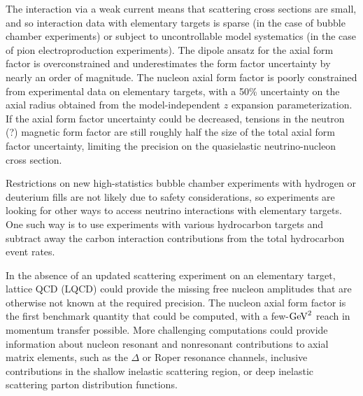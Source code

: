 The interaction via a weak current means that scattering cross sections are small,
 and so interaction data with elementary targets is sparse
 (in the case of bubble chamber experiments)
 or subject to uncontrollable model systematics
 (in the case of pion electroproduction experiments).
The dipole ansatz for the axial form factor is overconstrained
 and underestimates the form factor uncertainty by nearly an order of magnitude.
The nucleon axial form factor is poorly constrained from experimental data
 on elementary targets, with a 50\% uncertainty on the axial radius
 obtained from the model-independent $z$ expansion parameterization.
If the axial form factor uncertainty could be decreased,
 tensions in the neutron (?) magnetic form factor are still
 roughly half the size of the total axial form factor uncertainty,
 limiting the precision on the quasielastic neutrino-nucleon cross section.

Restrictions on new high-statistics bubble chamber experiments with
 hydrogen or deuterium fills are not likely due to safety considerations,
 so experiments are looking for other ways to access neutrino interactions
 with elementary targets.
One such way is to use experiments with various hydrocarbon targets
 and subtract away the carbon interaction contributions from
 the total hydrocarbon event rates.

In the absence of an updated scattering experiment on an elementary target,
 lattice QCD (LQCD) could provide the missing free nucleon amplitudes
 that are otherwise not known at the required precision.
The nucleon axial form factor is the first benchmark quantity that could be computed,
 with a few-${\rm GeV}^2$ reach in momentum transfer possible.
More challenging computations could provide information about nucleon
 resonant and nonresonant contributions to axial matrix elements,
 such as the $\Delta$ or Roper resonance channels,
 inclusive contributions in the shallow inelastic scattering region,
 or deep inelastic scattering parton distribution functions.
